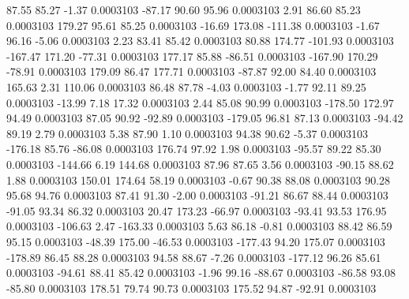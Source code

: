        87.55       85.27       -1.37     0.0003103
      -87.17       90.60       95.96     0.0003103
        2.91       86.60       85.23     0.0003103
      179.27       95.61       85.25     0.0003103
      -16.69      173.08     -111.38     0.0003103
       -1.67       96.16       -5.06     0.0003103
        2.23       83.41       85.42     0.0003103
       80.88      174.77     -101.93     0.0003103
     -167.47      171.20      -77.31     0.0003103
      177.17       85.88      -86.51     0.0003103
     -167.90      170.29      -78.91     0.0003103
      179.09       86.47      177.71     0.0003103
      -87.87       92.00       84.40     0.0003103
      165.63        2.31      110.06     0.0003103
       86.48       87.78       -4.03     0.0003103
       -1.77       92.11       89.25     0.0003103
      -13.99        7.18       17.32     0.0003103
        2.44       85.08       90.99     0.0003103
     -178.50      172.97       94.49     0.0003103
       87.05       90.92      -92.89     0.0003103
     -179.05       96.81       87.13     0.0003103
      -94.42       89.19        2.79     0.0003103
        5.38       87.90        1.10     0.0003103
       94.38       90.62       -5.37     0.0003103
     -176.18       85.76      -86.08     0.0003103
      176.74       97.92        1.98     0.0003103
      -95.57       89.22       85.30     0.0003103
     -144.66        6.19      144.68     0.0003103
       87.96       87.65        3.56     0.0003103
      -90.15       88.62        1.88     0.0003103
      150.01      174.64       58.19     0.0003103
       -0.67       90.38       88.08     0.0003103
       90.28       95.68       94.76     0.0003103
       87.41       91.30       -2.00     0.0003103
      -91.21       86.67       88.44     0.0003103
      -91.05       93.34       86.32     0.0003103
       20.47      173.23      -66.97     0.0003103
      -93.41       93.53      176.95     0.0003103
     -106.63        2.47     -163.33     0.0003103
        5.63       86.18       -0.81     0.0003103
       88.42       86.59       95.15     0.0003103
      -48.39      175.00      -46.53     0.0003103
     -177.43       94.20      175.07     0.0003103
     -178.89       86.45       88.28     0.0003103
       94.58       88.67       -7.26     0.0003103
     -177.12       96.26       85.61     0.0003103
      -94.61       88.41       85.42     0.0003103
       -1.96       99.16      -88.67     0.0003103
      -86.58       93.08      -85.80     0.0003103
      178.51       79.74       90.73     0.0003103
      175.52       94.87      -92.91     0.0003103
